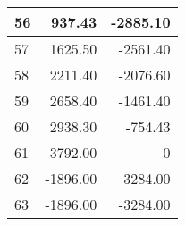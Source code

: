 \documentclass[12pt]{article}
\begin{document}
\begin{table}[H]
\begin{minipage}[t]{.33\linewidth}
{\begin{tabular}{@{}|l|r|r|@{}}
    	\hline
        56 & 937.43 & -2885.10 \\ 
    	\hline
        57 & 1625.50 & -2561.40 \\ 
    	\hline
        58 & 2211.40 & -2076.60 \\ 
    	\hline
        59 & 2658.40 & -1461.40 \\ 
    	\hline
        60 & 2938.30 & -754.43 \\ 
        \hline
        \hline
        61 & 3792.00 & 0 \\ 
        \hline
        62 & -1896.00 & 3284.00 \\ 
    	\hline
    	63 & -1896.00 & -3284.00 \\ 
    	\hline
    \end{tabular}%
 }%
\end{minipage} 
\end{table}

\newpage
\section*{}


\end{document}
